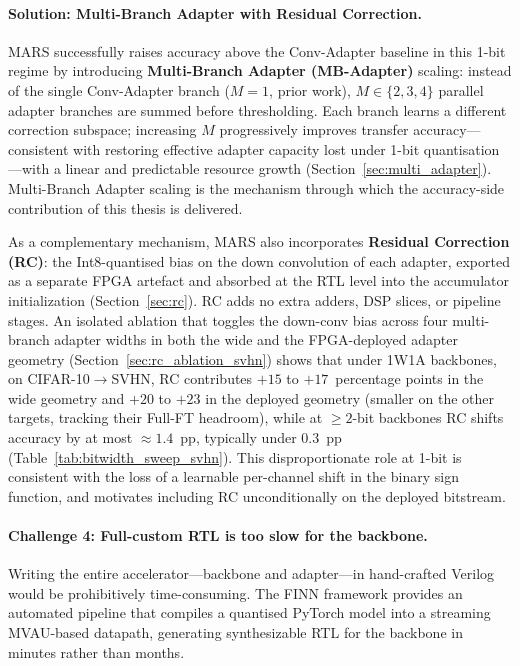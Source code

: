 \documentclass[12pt, a4paper]{report}
\numberwithin{equation}{chapter}
\numberwithin{figure}{chapter}
\numberwithin{table}{chapter}
\numberwithin{algorithm}{chapter}
\begin{document}
\paragraph{Solution: Multi-Branch Adapter with Residual Correction.}
MARS successfully raises accuracy above the Conv-Adapter baseline in this 1-bit regime by introducing \textbf{Multi-Branch Adapter (MB-Adapter)} scaling: instead of the single Conv-Adapter branch ($M{=}1$, prior work), $M \in \{2, 3, 4\}$ parallel adapter branches are summed before thresholding. Each branch learns a different correction subspace; increasing $M$ progressively improves transfer accuracy---consistent with restoring effective adapter capacity lost under 1-bit quantisation---with a linear and predictable resource growth (Section~\ref{sec:multi_adapter}). Multi-Branch Adapter scaling is the mechanism through which the accuracy-side contribution of this thesis is delivered.

As a complementary mechanism, MARS also incorporates \textbf{Residual Correction (RC)}: the Int8-quantised bias on the down convolution of each adapter, exported as a separate FPGA artefact and absorbed at the RTL level into the accumulator initialization (Section~\ref{sec:rc}). RC adds no extra adders, DSP slices, or pipeline stages. An isolated ablation that toggles the down-conv bias across four multi-branch adapter widths in both the wide and the FPGA-deployed adapter geometry (Section~\ref{sec:rc_ablation_svhn}) shows that under 1W1A backbones, on CIFAR-10$\to$SVHN, RC contributes $+15$ to $+17$~percentage points in the wide geometry and $+20$ to $+23$ in the deployed geometry (smaller on the other targets, tracking their Full-FT headroom), while at $\geq 2$-bit backbones RC shifts accuracy by at most $\approx 1.4$~pp, typically under $0.3$~pp (Table~\ref{tab:bitwidth_sweep_svhn}). This disproportionate role at 1-bit is consistent with the loss of a learnable per-channel shift in the binary sign function, and motivates including RC unconditionally on the deployed bitstream.

\paragraph{Challenge 4: Full-custom RTL is too slow for the backbone.}
Writing the entire accelerator---backbone and adapter---in hand-crafted Verilog would be prohibitively time-consuming. The FINN framework \cite{Umuroglu2017FINN, Blott2018FINNR} provides an automated pipeline that compiles a quantised PyTorch model into a streaming MVAU-based datapath, generating synthesizable RTL for the backbone in minutes rather than months.
\end{document}
